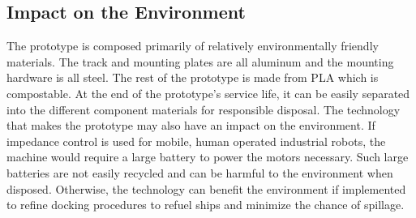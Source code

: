
\subsection*{Impact on the Environment}
The prototype is composed primarily of relatively environmentally friendly materials. The track and mounting plates are all aluminum and the mounting hardware is all steel. The rest of the prototype is made from PLA which is compostable. At the end of the prototype's service life, it can be easily separated into the different component materials for responsible disposal. The technology that makes the prototype may also have an impact on the environment. If impedance control is used for mobile, human operated industrial robots, the machine would require a large battery to power the motors necessary. Such large batteries are not easily recycled and can be harmful to the environment when disposed. Otherwise, the technology can benefit the environment if implemented to refine docking procedures to refuel ships and minimize the chance of spillage. 